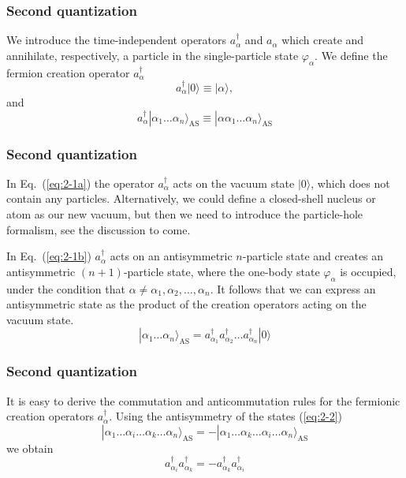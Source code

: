 \documentclass[compress]{beamer}
\newcommand*{\ket}[1]{|#1\rangle}
\begin{document}
\frame
{
  \frametitle{Second quantization}
\begin{small}
{\scriptsize
We introduce the time-independent  operators
$a_\alpha^\dagger$ and $a_\alpha$   which create and annihilate, respectively, a particle 
in the single-particle state 
$\varphi_\alpha$. 
We define the fermion creation operator
$a_\alpha^\dagger$ 
\begin{equation}
	a_\alpha^{\dagger}\ket{0} \equiv  \ket{\alpha}  \label{eq:2-1a},
\end{equation}
and
\begin{equation}
	a_\alpha^{\dagger}\ket{\alpha_1\dots \alpha_n}_{\mathrm{AS}} \equiv  \ket{\alpha\alpha_1\dots \alpha_n}_{\mathrm{AS}} \label{eq:2-1b}
\end{equation}
}
\end{small}
}

\frame
{
  \frametitle{Second quantization}
\begin{small}
{\scriptsize
In Eq.~(\ref{eq:2-1a}) 
the operator  $a_\alpha^\dagger$  acts on the vacuum state 
$\ket{0}$, which does not contain any particles. Alternatively, we could define  a closed-shell nucleus or atom as our new vacuum, but then
we need to introduce the particle-hole  formalism, see the discussion to come. 

In Eq.~(\ref{eq:2-1b}) $a_\alpha^\dagger$ acts on an antisymmetric $n$-particle state and 
creates an antisymmetric $(n+1)$-particle state, where the one-body state 
$\varphi_\alpha$ is occupied, under the condition that
$\alpha \ne \alpha_1, \alpha_2, \dots, \alpha_n$. 
It follows that we can express an antisymmetric state as the product of the creation
operators acting on the vacuum state.  
\begin{equation}
	\ket{\alpha_1\dots \alpha_n}_{\mathrm{AS}} = a_{\alpha_1}^\dagger a_{\alpha_2}^\dagger \dots a_{\alpha_n}^\dagger \ket{0} \label{eq:2-2}
\end{equation}
}
\end{small}
}

\frame
{
  \frametitle{Second quantization}
\begin{small}
{\scriptsize
It is easy to derive the commutation and anticommutation rules  for the fermionic creation operators 
$a_\alpha^\dagger$. Using the antisymmetry of the states 
(\ref{eq:2-2})
\begin{equation}
	\ket{\alpha_1\dots \alpha_i\dots \alpha_k\dots \alpha_n}_{\mathrm{AS}} = 
		- \ket{\alpha_1\dots \alpha_k\dots \alpha_i\dots \alpha_n}_{\mathrm{AS}} \label{eq:2-3a}
\end{equation}
we obtain
\begin{equation}
	 a_{\alpha_i}^\dagger  a_{\alpha_k}^\dagger = - a_{\alpha_k}^\dagger a_{\alpha_i}^\dagger \label{eq:2-3b}
\end{equation}
}
\end{small}
}
\end{document}
